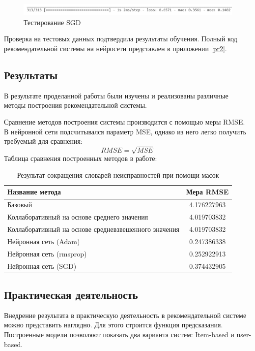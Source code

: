 \documentclass[bachelor, och, diploma]{SCWorks}
\begin{document}
\begin{figure}[ht!]

	\centering
	
	\includegraphics[width=0.8\linewidth]{pract4.png}
	
	\caption{Тестирование SGD}
	
	\label{fig:p4}
	
\end{figure}

Проверка на тестовых данных подтвердила результаты обучения.
Полный код рекомендательной системы на нейросети представлен в приложении \ref{pr2}.

\subsection{Результаты}
В результате проделанной работы были изучены и реализованы различные методы построения рекомендательной системы. 

Сравнение методов построения системы производится с помощью меры RMSE. В нейронной сети подсчитывался параметр MSE, однако из него легко получить требуемый для сравнения:
$$RMSE = \sqrt{MSE}$$
Таблица сравнения построенных методов в работе:

\begin{table}[!ht]
	\small
	\caption{Результат сокращения словарей неисправностей при помощи масок} \label{table-1}
	\begin{tabular}{|l|c|}
		\hline Название метода & Мера RMSE\\
		\hline Базовый & 4.176227963 \\
		\hline Коллаборативный на основе среднего значения & 4.019703832 \\
		\hline Коллаборативный на основе средневзвешенного значения & 4.019703832 \\
		\hline Нейронная сеть (Adam) & 0.247386338 \\
		\hline Нейронная сеть (rmsprop) & 0.252922913 \\
		\hline Нейронная сеть (SGD) & 0.374432905 \\
		
		\hline
	\end{tabular}
\end{table}

\subsection{Практическая деятельность}
Внедрение результата в практическую деятельность в рекомендательной системе можно представить наглядно. Для этого строится функция предсказания. Построенные модели позволяют показать два варианта систем: Item-based и user-based.
\end{document}
